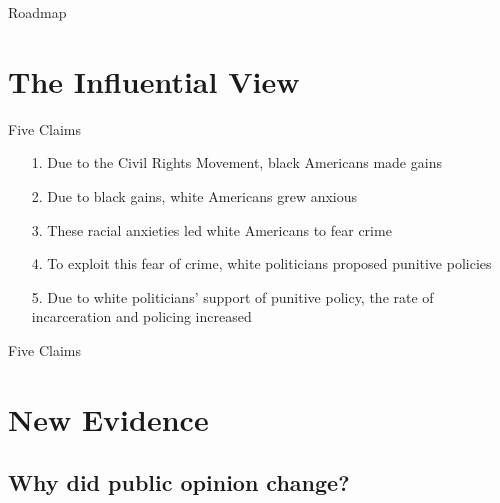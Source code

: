 \documentclass{beamer}
\newcommand{\claimone}{Due to the Civil Rights Movement, black Americans made gains}
\newcommand{\claimtwo}{Due to black gains, white Americans grew anxious}
\newcommand{\claimthree}{These racial anxieties led white Americans to fear crime}
\newcommand{\claimfour}{To exploit this fear of crime, white politicians proposed punitive policies}
\newcommand{\claimfive}{Due to white politicians' support of punitive policy, the rate of incarceration and policing increased}
\begin{document}

\begin{frame}{Roadmap}
    \tableofcontents
\end{frame}



\section{The Influential View}

\begin{frame}{Five Claims} \pause
\begin{itemize}[<+->]
    \item[1.] \claimone
    \item[2.] \claimtwo
    \item[3.] \claimthree
    \item[4.] \claimfour
    \item[5.] \claimfive
\end{itemize}
\end{frame}

\begin{frame}{Five Claims}
\begin{itemize}
    \item[1.] \claimone
    \item[2.] \claimtwo
    \alert{\item[3.] \claimthree
    \item[4.] \claimfour
    \item[5.] \claimfive}
\end{itemize}
\end{frame}


\section{New Evidence}

\newcommand{\claimthreeq}{Why did public opinion change?}
\newcommand{\claimfourq}{Why did politicians turn punitive?}
\newcommand{\claimfiveq}{Why did prisons and police grow?}

\subsection{\claimthreeq}
\end{document}
